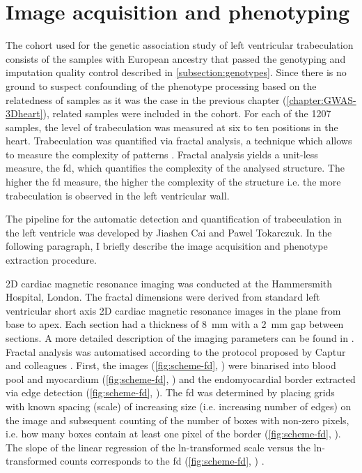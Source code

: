 \section{Image acquisition and phenotyping}
The cohort used for the genetic association study of left ventricular trabeculation consists of the samples with European ancestry that passed the genotyping and imputation quality control described in \cref{subsection:genotypes}. Since there is no ground to suspect confounding of the phenotype processing based on the relatedness of samples as it was the case in the previous chapter (\cref{chapter:GWAS-3Dheart}), related samples were included in the cohort. For each of the \num{1207} samples, the level of trabeculation was measured at six to ten positions in the heart. Trabeculation was quantified via fractal analysis, a technique which allows to measure the complexity of patterns \citep{Eke2002}. Fractal analysis yields a unit-less measure, the \gls{fd}, which quantifies the complexity of the analysed structure. The higher the \gls{fd} measure, the higher the complexity of the structure i.e. the more trabeculation is observed in the left ventricular wall. 

The pipeline for the automatic detection and quantification of trabeculation in the left ventricle was developed by Jiashen Cai and Pawel Tokarczuk. In the following paragraph, I briefly describe the image acquisition and phenotype extraction procedure. 

2D cardiac magnetic resonance imaging was conducted at the Hammersmith Hospital, London. The fractal dimensions were derived from standard left ventricular short axis 2D cardiac magnetic resonance images in the plane from base to apex. Each section had a thickness of \num{8}~mm with a \num{2}~mm gap between sections. A more detailed description of the imaging parameters can be found in \citep{deMarvao2014}. Fractal analysis was automatised according to the protocol proposed by Captur and colleagues \citeyearpar{Captur2013}. First, the images (\cref{fig:scheme-fd}, ) were binarised into blood pool and myocardium (\cref{fig:scheme-fd}, ) and the endomyocardial border extracted via edge detection (\cref{fig:scheme-fd}, ). The \gls{fd} was determined by placing grids with known spacing (scale) of increasing size (i.e. increasing number of edges) on the image and subsequent counting of the number of boxes with non-zero pixels, i.e. how many boxes contain at least one pixel of the border (\cref{fig:scheme-fd}, ). The slope of the linear regression of the ln-transformed scale versus the ln-transformed counts corresponds to the \gls{fd} (\cref{fig:scheme-fd}, ) \citep{Captur2013}.

